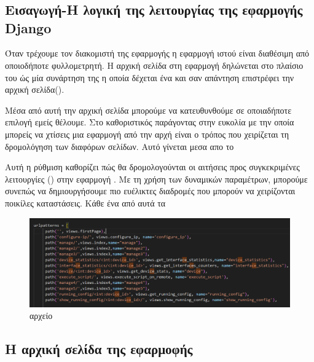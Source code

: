 \chapter{}

\section{Εισαγωγή-Η λογική της λειτουργίας της εφαρμογής Django}

Όταν τρέχουμε τον διακομιστή της εφαρμογής η εφαρμογή ιστού
είναι διαθέσιμη από οποιοδήποτε φυλλομετρητή. Η αρχική σελίδα στη εφαρμογή
 δηλώνεται στο πλαίσιο του  ώς μία συνάρτηση της 
η οποία δέχεται ένα  και σαν απάντηση επιστρέφει την αρχική σελίδα().

Μέσα από αυτή την αρχική σελίδα μπορούμε να κατευθυνθούμε σε οποιαδήποτε επιλογή εμείς θέλουμε.
Στο  καθοριστικός παράγοντας στην ευκολία με την οποία
μπορείς να χτίσεις μια εφαρμογή από την αρχή είναι ο τρόπος που χειρίζεται
τη δρομολόγηση των διαφόρων σελίδων. Αυτό γίνεται μεσα απο το 

Αυτή η ρύθμιση καθορίζει πώς θα δρομολογούνται οι 
αιτήσεις  προς συγκεκριμένες λειτουργίες () 
στην εφαρμογή . Με τη χρήση των δυναμικών παραμέτρων, 
μπορούμε συνεπώς να δημιουργήσουμε πιο ευέλικτες διαδρομές  
που μπορούν να χειρίζονται ποικίλες καταστάσεις. Κάθε ένα από αυτά
τα 


\begin{figure}[h]
	\centering
	\includegraphics[width=1.0\textwidth]{graphics/urls.png}
	\caption{  αρχείο}
\end{figure}

\FloatBarrier



\section{Η αρχική σελίδα της εφαρμοφής}

